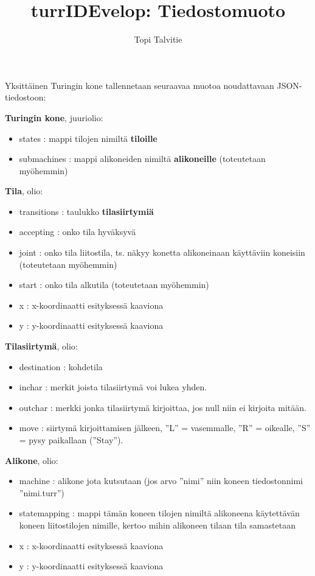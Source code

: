 \documentclass[a4paper, 11pt, finnish]{article}
\author{Topi Talvitie}
\title{turrIDEvelop: Tiedostomuoto}
\begin{document}
\maketitle

Yksittäinen Turingin kone tallennetaan seuraavaa muotoa noudattavaan
JSON-tiedostoon:

\textbf{Turingin kone}, juuriolio:
\begin{itemize}
\item states : mappi tilojen nimiltä \textbf{tiloille}
\item submachines : mappi alikoneiden nimiltä \textbf{alikoneille} (toteutetaan
myöhemmin)
\end{itemize}

\textbf{Tila}, olio:
\begin{itemize}
\item transitions : taulukko \textbf{tilasiirtymiä}
\item accepting : onko tila hyväksyvä
\item joint : onko tila liitostila, ts. näkyy konetta alikoneinaan käyttäviin
koneisiin (toteutetaan myöhemmin)
\item start : onko tila alkutila (toteutetaan myöhemmin)
\item x : x-koordinaatti esityksessä kaaviona
\item y : y-koordinaatti esityksessä kaaviona
\end{itemize}

\textbf{Tilasiirtymä}, olio:
\begin{itemize}
\item destination : kohdetila
\item inchar : merkit joista tilasiirtymä voi lukea yhden.
\item outchar : merkki jonka tilasiirtymä kirjoittaa, jos null niin ei
kirjoita mitään.
\item move : siirtymä kirjoittamisen jälkeen, ''L'' = vasemmalle, ''R'' =
oikealle, ''S'' = pysy paikallaan (''Stay'').
\end{itemize}

\textbf{Alikone}, olio:
\begin{itemize}
\item machine : alikone jota kutsutaan (jos arvo ''nimi'' niin koneen
tiedostonnimi ''nimi.turr'')
\item statemapping : mappi tämän koneen tilojen nimiltä alikoneena käytettävän
koneen liitostilojen nimille, kertoo mihin alikoneen tilaan tila samastetaan
\item x : x-koordinaatti esityksessä kaaviona
\item y : y-koordinaatti esityksessä kaaviona
\end{itemize}
\end{document}
